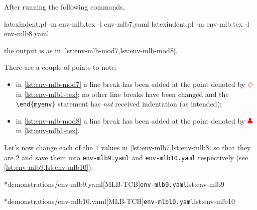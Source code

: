 	After running the following commands,
	\begin{commandshell}
latexindent.pl -m env-mlb.tex -l env-mlb7.yaml
latexindent.pl -m env-mlb.tex -l env-mlb8.yaml
\end{commandshell}
	the output is as in \cref{lst:env-mlb-mod7,lst:env-mlb-mod8}.

	\begin{widepage}
		\begin{minipage}{.42\linewidth}
		\end{minipage}
		\hfill
		\begin{minipage}{.57\linewidth}
		\end{minipage}
	\end{widepage}

	There are a couple of points to note:
	\begin{itemize}
		\item in \cref{lst:env-mlb-mod7} a line break has been added at the point denoted by
		      $\color{red}\diamondsuit$ in \vref{lst:env-mlb1-tex}; no other line breaks have been
		      changed and the \lstinline!\end{myenv}! statement has \emph{not}
		      received indentation (as intended);
		\item in \cref{lst:env-mlb-mod8} a line break has been added at the point denoted by
		      $\color{red}\clubsuit$ in \vref{lst:env-mlb1-tex}.
	\end{itemize}

	Let's now change each of the \texttt{1} values in
	\cref{lst:env-mlb7,lst:env-mlb8} so that they are $2$ and save them
	into \texttt{env-mlb9.yaml} and \texttt{env-mlb10.yaml} respectively (see
	\cref{lst:env-mlb9,lst:env-mlb10}).

	\begin{minipage}{.49\textwidth}
		\cmhlistingsfromfile[style=yaml-LST]*{demonstrations/env-mlb9.yaml}[MLB-TCB]{\texttt{env-mlb9.yaml}}{lst:env-mlb9}
	\end{minipage}
	\hfill
	\begin{minipage}{.49\textwidth}
		\cmhlistingsfromfile[style=yaml-LST]*{demonstrations/env-mlb10.yaml}[MLB-TCB]{\texttt{env-mlb10.yaml}}{lst:env-mlb10}
	\end{minipage}


